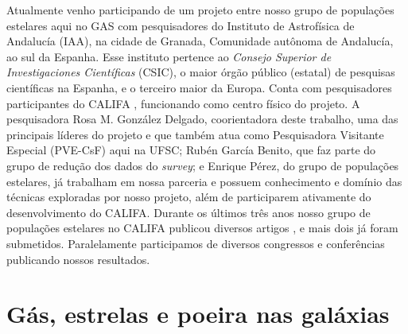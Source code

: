 Atualmente venho participando de um projeto entre nosso grupo de populações estelares aqui no GAS
com pesquisadores do Instituto de Astrofísica de Andalucía (IAA), na cidade de Granada, Comunidade
autônoma de Andalucía, ao sul da Espanha. Esse instituto pertence ao {\em Consejo Superior de
Investigaciones Científicas} (CSIC), o maior órgão público (estatal) de pesquisas científicas na
Espanha, e o terceiro maior da Europa. Conta com pesquisadores participantes do CALIFA
\citep[][]{Sanchez.etal.2012a}, funcionando como centro físico do projeto. A pesquisadora Rosa M.
González Delgado, coorientadora deste trabalho, uma das principais líderes do projeto e que também
atua como Pesquisadora Visitante Especial (PVE-CsF) aqui na UFSC; Rubén García Benito, que faz parte
do grupo de redução dos dados do {\em survey}; e Enrique Pérez, do grupo de populações estelares,
já trabalham em nossa parceria e possuem conhecimento e domínio das técnicas exploradas por nosso
projeto, além de participarem ativamente do desenvolvimento do CALIFA. Durante os últimos três anos
nosso grupo de populações estelares no CALIFA publicou diversos artigos \citep[e.g.,
][]{Perez.etal.2013a, GonzalezDelgado.etal.2014a, GonzalezDelgado.etal.2014b,
GonzalezDelgado.etal.2015a}, e mais dois já foram submetidos. Paralelamente participamos de diversos
congressos e conferências publicando nossos resultados.


\section{Gás, estrelas e poeira nas galáxias}
\label{sec:intro:galaxias}

